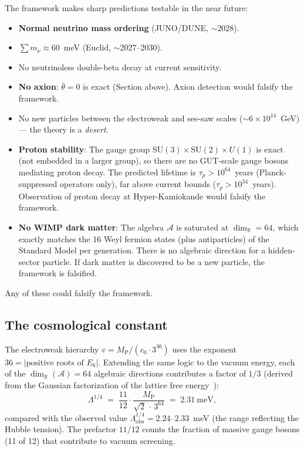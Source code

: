 \documentclass[12pt,a4paper]{article}
\theoremstyle{definition}
\theoremstyle{remark}
\newcommand{\Real}{\mathbb{R}}
\newcommand{\Alg}{\mathcal{A}}
\newcommand{\SU}{\mathrm{SU}}
\newcommand{\MP}{M_{\mathrm{P}}}
\begin{document}
The framework makes sharp predictions testable in the near future:
\begin{itemize}
\item \textbf{Normal neutrino mass ordering} (JUNO/DUNE, $\sim$2028).
\item $\sum m_\nu \approx 60$~meV (Euclid, $\sim$2027--2030).
\item No neutrinoless double-beta decay at current sensitivity.
\item \textbf{No axion}: $\bar\theta = 0$ is exact (Section above). 
Axion detection would falsify the framework.
\item No new particles between the electroweak and see-saw scales 
($\sim 6\times 10^{14}$~GeV) --- the theory is a \emph{desert}.
\item \textbf{Proton stability}: The gauge group $\SU(3)\times\SU(2)\times U(1)$ 
is exact (not embedded in a larger group), so there are no GUT-scale gauge 
bosons mediating proton decay. The predicted lifetime is 
$\tau_p > 10^{64}$~years (Planck-suppressed operators only), far above 
current bounds ($\tau_p > 10^{34}$~years). Observation of proton decay at 
Hyper-Kamiokande would falsify the framework.
\item \textbf{No WIMP dark matter}: The algebra $\Alg$ is saturated at 
$\dim_\Real = 64$, which exactly matches the 16 Weyl fermion states 
(plus antiparticles) of the Standard Model per generation. There is no 
algebraic direction for a hidden-sector particle. If dark matter is 
discovered to be a new particle, the framework is falsified.
\end{itemize}
Any of these could falsify the framework.

\subsection{The cosmological constant}

The electroweak hierarchy $v = \MP/(c_0 \cdot 3^{36})$ uses the exponent 
$36 = |\text{positive roots of } E_6|$. Extending the same logic to the 
vacuum energy, each of the $\dim_\Real(\Alg) = 64$ algebraic directions 
contributes a factor of $1/3$ (derived from the Gaussian factorization of 
the lattice free energy~\cite{Paper3}):
\begin{equation}
\Lambda^{1/4} \;=\; \frac{11}{12}\cdot\frac{\MP}{\sqrt{2}\,\cdot\, 3^{64}}
\;=\; 2.31~\text{meV},
\label{eq:cc}
\end{equation}
compared with the observed value $\Lambda^{1/4}_{\text{obs}} = 2.24$--$2.33$~meV 
(the range reflecting the Hubble tension). The prefactor $11/12$ counts the 
fraction of massive gauge bosons (11 of 12) that contribute to vacuum 
screening.
\end{document}
